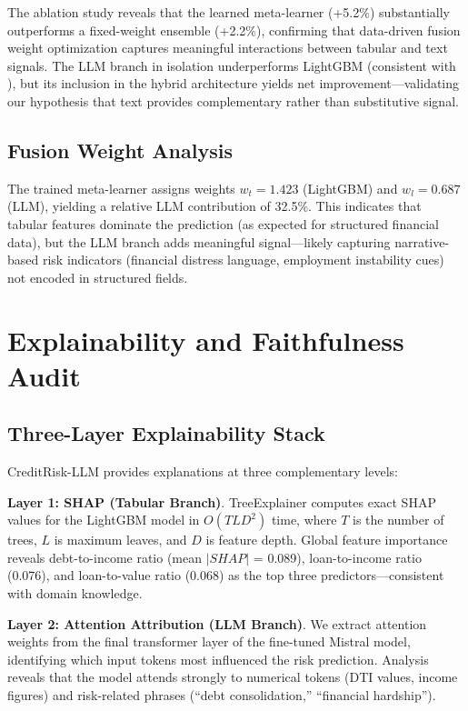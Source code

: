 \documentclass[11pt,a4paper]{article}
\begin{document}
The ablation study reveals that the learned meta-learner (+5.2\%) substantially outperforms a fixed-weight ensemble (+2.2\%), confirming that data-driven fusion weight optimization captures meaningful interactions between tabular and text signals. The LLM branch in isolation underperforms LightGBM (consistent with \citealt{wang2024zeroshot}), but its inclusion in the hybrid architecture yields net improvement---validating our hypothesis that text provides complementary rather than substitutive signal.

\subsection{Fusion Weight Analysis}

The trained meta-learner assigns weights $w_t = 1.423$ (LightGBM) and $w_l = 0.687$ (LLM), yielding a relative LLM contribution of 32.5\%. This indicates that tabular features dominate the prediction (as expected for structured financial data), but the LLM branch adds meaningful signal---likely capturing narrative-based risk indicators (financial distress language, employment instability cues) not encoded in structured fields.

\section{Explainability and Faithfulness Audit}\label{sec:xai}

\subsection{Three-Layer Explainability Stack}

CreditRisk-LLM provides explanations at three complementary levels:

\textbf{Layer 1: SHAP (Tabular Branch)}. TreeExplainer computes exact SHAP values for the LightGBM model in $O(TLD^2)$ time, where $T$ is the number of trees, $L$ is maximum leaves, and $D$ is feature depth. Global feature importance reveals debt-to-income ratio (mean $|SHAP|$ = 0.089), loan-to-income ratio (0.076), and loan-to-value ratio (0.068) as the top three predictors---consistent with domain knowledge.

\textbf{Layer 2: Attention Attribution (LLM Branch)}. We extract attention weights from the final transformer layer of the fine-tuned Mistral model, identifying which input tokens most influenced the risk prediction. Analysis reveals that the model attends strongly to numerical tokens (DTI values, income figures) and risk-related phrases (``debt consolidation,'' ``financial hardship'').
\end{document}
